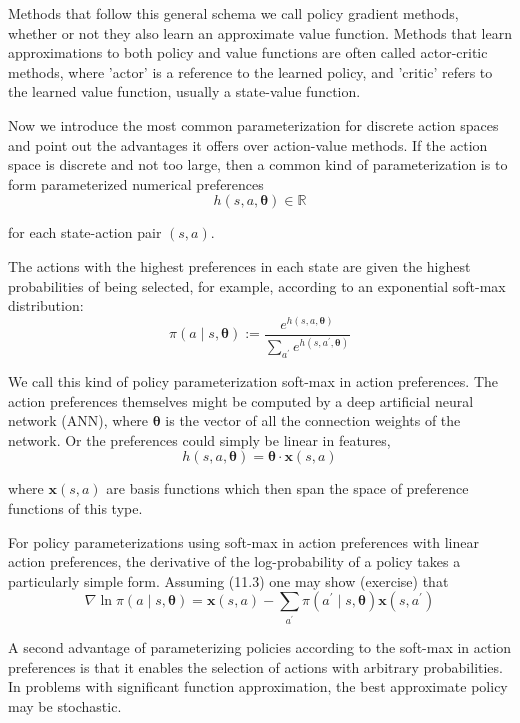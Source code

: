 \documentclass[11pt]{article}
\theoremstyle{plain} %
\theoremstyle{remark}
\begin{document}
Methods that follow this general schema we call policy gradient methods,
  whether or not they also learn an approximate value function.  Methods that learn approximations to both policy and value functions are
  often called actor-critic methods, where 'actor' is a reference to the learned
  policy, and 'critic' refers to the learned value function, usually a
  state-value function.

Now we introduce the most common parameterization for discrete action
  spaces and point out the advantages it offers over action-value methods. If the action space is discrete and not too large, then a common kind of
  parameterization is to form parameterized numerical preferences
$$
h(s, a, \boldsymbol{\theta}) \in \mathbb{R}
$$

for each state-action pair $(s, a)$.

 The actions with the highest preferences in each state are given the
  highest probabilities of being selected, for example, according to an
  exponential soft-max distribution:
$$
\pi(a \mid s, \boldsymbol{\theta}):=\frac{e^{h(s, a, \boldsymbol{\theta})}}{\sum_{a^{\prime}} e^{h\left(s, a^{\prime}, \boldsymbol{\theta}\right)}}
$$

We call this kind of policy parameterization soft-max in action
  preferences. The action preferences themselves might be computed by a deep artificial
  neural network (ANN), where $\boldsymbol{\theta}$ is the vector of all the
  connection weights of the network. Or the preferences could simply be linear in features,
$$
h(s, a, \boldsymbol{\theta})=\boldsymbol{\theta} \cdot \boldsymbol{x}(s, a)
$$

where $\boldsymbol{x}(s, a)$ are basis functions which then span the space of
preference functions of this type.

For policy parameterizations using soft-max in action preferences with
  linear action preferences, the derivative of the log-probability of a policy
  takes a particularly simple form. Assuming (11.3) one may show (exercise) that
$$
\nabla \ln \pi(a \mid s, \boldsymbol{\theta})=\boldsymbol{x}(s, a)-\sum_{a^{\prime}} \pi\left(a^{\prime} \mid s, \boldsymbol{\theta}\right) \boldsymbol{x}\left(s, a^{\prime}\right)
$$

A second advantage of parameterizing policies according to the soft-max
  in action preferences is that it enables the selection of actions with
  arbitrary probabilities. In problems with significant function approximation, the best
  approximate policy may be stochastic.
\end{document}
